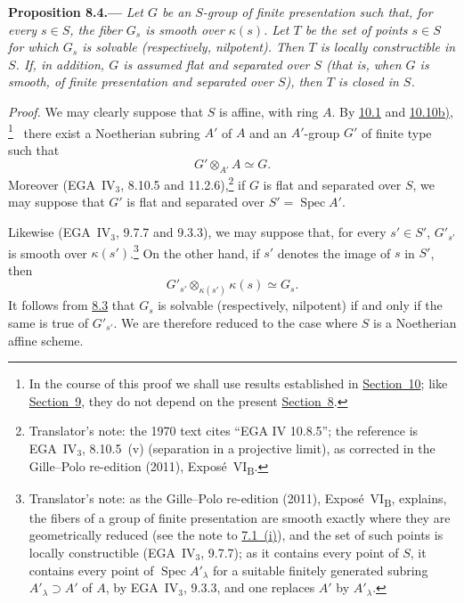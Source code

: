 
\medskip
{}\label{prop:sga3-VIB-8.4}%
\noindent\textbf{Proposition 8.4.---}
\emph{Let \(G\) be an \(S\)-group of finite presentation such
that, for every \(s\in S\), the fiber \(G_s\) is smooth over
\(\kappa(s)\). Let \(T\) be the set of points \(s\in S\) for
which \(G_s\) is solvable \textup{(respectively, nilpotent)}.
Then \(T\) is locally constructible in \(S\). If, in addition,
\(G\) is assumed flat and separated over \(S\) \textup{(that is,
when \(G\) is smooth, of finite presentation and separated over
\(S\))}, then \(T\) is closed in \(S\).}

\emph{Proof.}
We may clearly suppose that \(S\) is affine, with ring \(A\).
By \hyperref[par:sga3-VIB-10.1]{10.1} and
\hyperref[par:sga3-VIB-10.10]{10.10\textup{b)}},%
\begingroup
\renewcommand{\thefootnote}{\fnsymbol{footnote}}%
\footnote[1]{\label{note:sga3-VIB-8.4-star}
In the course of this proof we shall use results established
in \hyperref[sec:sga3-VIB-10]{Section~10}; like \hyperref[sec:sga3-VIB-9]{Section~9}, they do not depend on the
present \hyperref[sec:sga3-VIB-8]{Section~8}.}%
\endgroup\ 
there exist a Noetherian subring \(A'\) of \(A\) and an
\(A'\)-group \(G'\) of finite type such that
\[
  G'\otimes_{A'}A\simeq G.
\]
Moreover (EGA~IV\(_3\), 8.10.5 and 11.2.6),\footnote{Translator's note: the 1970 text cites ``EGA IV
10.8.5''; the reference is EGA~IV\(_3\), 8.10.5~(v) (separation in a projective limit), as corrected in the
Gille--Polo re-edition (2011), Exposé~VI\textsubscript{B}.}
if \(G\) is flat and separated over \(S\), we may suppose that
\(G'\) is flat and separated over
\(S'=\operatorname{Spec}A'\).%

Likewise (EGA~IV\(_3\), 9.7.7 and 9.3.3), we may suppose that,
for every \(s'\in S'\), \(G'_{s'}\) is smooth over
\(\kappa(s')\).\footnote{Translator's note: as the Gille--Polo re-edition (2011), Exposé~VI\textsubscript{B},
explains, the fibers of a group of finite presentation are smooth exactly where they are geometrically
reduced (see the note to \hyperref[concl:sga3-VIB-7.1-i]{7.1~(i)}), and the set of such points is locally
constructible (EGA~IV\(_3\), 9.7.7); as it contains every point of \(S\), it contains every point of
\(\operatorname{Spec}A'_\lambda\) for a suitable finitely generated subring \(A'_\lambda\supset A'\) of \(A\),
by EGA~IV\(_3\), 9.3.3, and one replaces \(A'\) by \(A'_\lambda\).} On the other hand,
if \(s'\) denotes the image of \(s\) in \(S'\), then
\[
  G'_{s'}\otimes_{\kappa(s')}\kappa(s)\simeq G_s.
\]
It follows from \hyperref[prop:sga3-VIB-8.3]{8.3} that \(G_s\)
is solvable (respectively, nilpotent) if and only if the same
is true of \(G'_{s'}\). We are therefore reduced to the case
where \(S\) is a Noetherian affine scheme.

